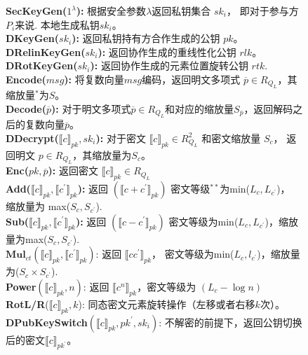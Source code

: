 \begin{figure}[htb]
	\begin{framed}
		{\wuhao 
		\noindent \textbf{SecKeyGen($1^\lambda$):} 根据安全参数$ \lambda $返回私钥集合 ${sk_i}$，
		即对于参与方$P_i$来说. 本地生成私钥$ sk_i $。\\
		\noindent \textbf{DKeyGen(${sk_i}$):} 返回私钥持有方合作生成的公钥 $pk$。\\
		\noindent \textbf{DRelinKeyGen(${sk_i}$):} 返回协作生成的重线性化公钥 $rlk$。\\
		\noindent \textbf{DRotKeyGen(${sk_i}$):} 返回协作生成的元素位置旋转公钥 $rtk$.\\
		\noindent \textbf{Encode($msg$):} 将复数向量$msg$编码，返回明文多项式 $\overline{p}\in R_{Q_{L}}$，其缩放量$^*$为$S$。\\
		\noindent \textbf{Decode($\overline{p}$):} 对于明文多项式$\overline{p}\in R_{Q_{L}}$和对应的缩放量$S_{\overline{p}}$，返回解码之后的复数向量$\overline{p}$。\\
		\noindent \textbf{DDecrypt($\llbracket c\rrbracket_{pk}, {sk_i}$):} 对于密文 $\llbracket c\rrbracket_{pk}\in R^2_{Q_{L}}$ 和密文缩放量 $S_c$， 返回明文 $p\in R_{Q_{L}}$，其缩放量为$S_c$。\\
		\noindent \textbf{Enc($pk, \overline{p}$):} 返回密文 $\llbracket c\rrbracket_{pk}\in R_{Q_{L}}$ \\
		\noindent \textbf{Add($\llbracket c\rrbracket_{pk}, \llbracket c^{\prime}\rrbracket_{pk}$):} 返回 $(\llbracket c+c^{\prime}\rrbracket_{pk})$ 
		密文等级$^{**}$为min($L_c, L_{c^{\prime}}$)， 缩放量为 max($S_c, S_{c^{\prime}}$).\\
		\noindent \textbf{Sub($\llbracket c\rrbracket_{pk}, \llbracket c^{\prime}\rrbracket_{pk}$):} 返回 $(\llbracket c-c^{\prime}\rrbracket_{pk})$ 
		密文等级为min($L_c, L_{c^{\prime}}$)，缩放量为max($S_c, S_{c^{\prime}}$).\\
		\noindent $\textbf{Mul}_{ct}$$(\llbracket c\rrbracket_{pk}, \llbracket c^{\prime}\rrbracket_{pk})$: 返回 $\llbracket cc^{\prime}\rrbracket_{pk}$， 密文等级为min($L_c, l_{c^{\prime}}$)，缩放量为($S_c\times S_{c^{\prime}}$).\\
		\noindent \textbf{Power}$(\llbracket c\rrbracket_{pk}, n)$: 返回 $\llbracket c^{n}\rrbracket_{pk}$，密文等级为 $(L_c-\log{n})$\\
		\noindent \textbf{RotL/R}($\llbracket c\rrbracket_{pk}, k$): 同态密文元素旋转操作（左移或者右移$k$次）。\\
		\noindent \textbf{DPubKeySwitch}$(\llbracket c\rrbracket_{pk}, pk^{\prime},{sk_i})$: 不解密的前提下，返回公钥切换后的密文$\llbracket c\rrbracket_{pk^{\prime}}$。\\
$$}
\end{framed}
\end{figure}
